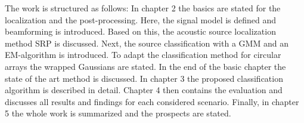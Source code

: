 The work is structured as follows: In chapter 2 the basics are stated for the localization and the post-processing. Here, the signal model is defined and beamforming is introduced. Based on this, the acoustic source localization method \ac{SRP} is discussed. Next, the source classification with a \ac{GMM} and an \ac{EM}-algorithm is introduced. To adapt the classification method for circular arrays the wrapped Gaussians are stated. In the end of the basic chapter the state of the art method is discussed. In chapter 3 the proposed classification algorithm is described in detail. Chapter 4 then contains the evaluation and discusses all results and findings for each considered scenario. Finally, in chapter 5 the whole work is summarized and the prospects are stated.
\endinput
